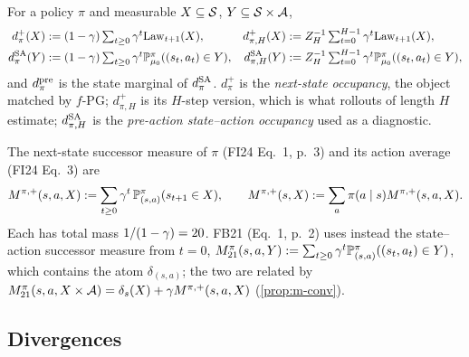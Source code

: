 \begin{definition}[occupancies]\label{def:m-occ}
For a policy $\pi$ and measurable $X\subseteq\cS$, $Y\subseteq\cS\times\cA$,
\begin{align*}
d^+_\pi(X)&:=(1-\gamma)\textstyle\sum_{t\ge0}\gamma^t\law_{t+1}(X), &
d^+_{\pi,H}(X)&:=Z_H^{-1}\textstyle\sum_{t=0}^{H-1}\gamma^t\law_{t+1}(X),\\
d^{\SA}_\pi(Y)&:=(1-\gamma)\textstyle\sum_{t\ge0}\gamma^t\Prob^\pi_{\mu_0}((s_t,a_t)\in Y), &
d^{\SA}_{\pi,H}(Y)&:=Z_H^{-1}\textstyle\sum_{t=0}^{H-1}\gamma^t\Prob^\pi_{\mu_0}((s_t,a_t)\in Y),
\end{align*}
and $d^{\pre}_\pi$ is the state marginal of $d^{\SA}_\pi$.
$d^+_\pi$ is the \emph{next-state occupancy}, the object matched by $f$-PG; $d^+_{\pi,H}$ is its $H$-step version, which is what rollouts of length $H$ estimate; $d^{\SA}_{\pi,H}$ is the \emph{pre-action state--action occupancy} used as a diagnostic.
\end{definition}

\begin{definition}\label{def:m-succ}
The next-state successor measure of $\pi$ (FI24 Eq.~1, p.~3) and its action average (FI24 Eq.~3) are
\[
M^{\pi,+}(s,a,X):=\sum_{t\ge0}\gamma^t\,\Prob^\pi_{(s,a)}(s_{t+1}\in X),\qquad M^{\pi,+}(s,X):=\sum_a\pi(a\mid s)M^{\pi,+}(s,a,X).
\]
Each has total mass $1/(1-\gamma)=\vn{const.mass}{20}$. FB21 (Eq.~1, p.~2) uses instead the state--action successor measure from $t=0$, $M^\pi_{21}(s,a,Y):=\sum_{t\ge0}\gamma^t\Prob^\pi_{(s,a)}((s_t,a_t)\in Y)$, which contains the atom $\delta_{(s,a)}$; the two are related by $M^\pi_{21}(s,a,X\times\cA)=\delta_s(X)+\gamma M^{\pi,+}(s,a,X)$ (\cref{prop:m-conv}).
\end{definition}

\subsection{Divergences}

